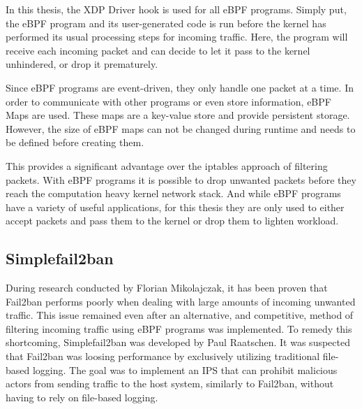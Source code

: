 In this thesis, the \ac{XDP} Driver hook is used for all \ac{eBPF} programs.
Simply put, the \ac{eBPF} program and its user-generated code is run before the kernel has performed its usual processing steps for incoming traffic.
Here, the program will receive each incoming packet and can decide to let it pass to the kernel unhindered, or drop it prematurely.

Since \ac{eBPF} programs are event-driven, they only handle one packet at a time.
In order to communicate with other programs or even store information, \ac{eBPF} Maps are used.
These maps are a key-value store and provide persistent storage.
However, the size of \ac{eBPF} maps can not be changed during runtime and needs to be defined before creating them.\cite{mikolajczak:ebpf}

This provides a significant advantage over the iptables approach of filtering packets.
With \ac{eBPF} programs it is possible to drop unwanted packets before they reach the computation heavy kernel network stack.
And while \ac{eBPF} programs have a variety of useful applications, for this thesis they are only used to either accept packets and pass them to the kernel or drop them to lighten workload.

\subsection{Simplefail2ban}
During research conducted by Florian Mikolajczak, it has been proven that Fail2ban performs poorly when dealing with large amounts of incoming unwanted traffic.
This issue remained even after an alternative, and competitive, method of filtering incoming traffic using \ac{eBPF} programs was implemented.
To remedy this shortcoming, Simplefail2ban was developed by Paul Raatschen.
It was suspected that Fail2ban was loosing performance by exclusively utilizing traditional file-based logging.
The goal was to implement an \ac{IPS} that can prohibit malicious actors from sending traffic to the host system, similarly to Fail2ban, without having to rely on file-based logging.

